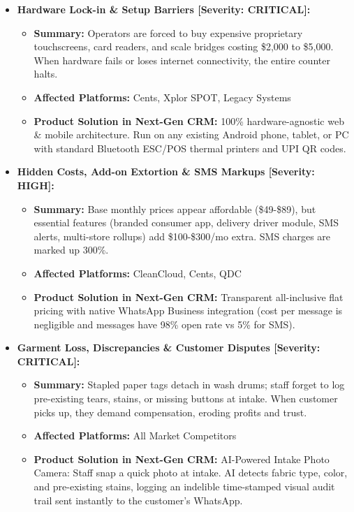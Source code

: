 \documentclass[11pt,a4paper]{article}
\begin{document}
\begin{itemize}[leftmargin=*]
\item \textbf{Hardware Lock-in \& Setup Barriers [Severity: CRITICAL]:}
\begin{itemize}
    \item \textbf{Summary:} Operators are forced to buy expensive proprietary touchscreens, card readers, and scale bridges costing \$2,000 to \$5,000. When hardware fails or loses internet connectivity, the entire counter halts.
    \item \textbf{Affected Platforms:} Cents, Xplor SPOT, Legacy Systems
    \item \textbf{Product Solution in Next-Gen CRM:} 100\% hardware-agnostic web \& mobile architecture. Run on any existing Android phone, tablet, or PC with standard Bluetooth ESC/POS thermal printers and UPI QR codes.
\end{itemize}
\item \textbf{Hidden Costs, Add-on Extortion \& SMS Markups [Severity: HIGH]:}
\begin{itemize}
    \item \textbf{Summary:} Base monthly prices appear affordable (\$49-\$89), but essential features (branded consumer app, delivery driver module, SMS alerts, multi-store rollups) add \$100-\$300/mo extra. SMS charges are marked up 300\%.
    \item \textbf{Affected Platforms:} CleanCloud, Cents, QDC
    \item \textbf{Product Solution in Next-Gen CRM:} Transparent all-inclusive flat pricing with native WhatsApp Business integration (cost per message is negligible and messages have 98\% open rate vs 5\% for SMS).
\end{itemize}
\item \textbf{Garment Loss, Discrepancies \& Customer Disputes [Severity: CRITICAL]:}
\begin{itemize}
    \item \textbf{Summary:} Stapled paper tags detach in wash drums; staff forget to log pre-existing tears, stains, or missing buttons at intake. When customer picks up, they demand compensation, eroding profits and trust.
    \item \textbf{Affected Platforms:} All Market Competitors
    \item \textbf{Product Solution in Next-Gen CRM:} AI-Powered Intake Photo Camera: Staff snap a quick photo at intake. AI detects fabric type, color, and pre-existing stains, logging an indelible time-stamped visual audit trail sent instantly to the customer's WhatsApp.

\end{itemize}
\end{itemize}
\end{document}
